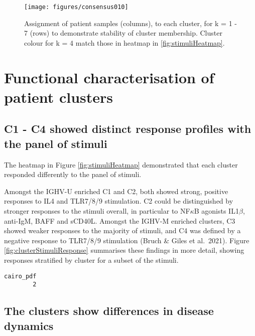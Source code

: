 \documentclass[11pt, a4paper, twosided]{book}
\begin{document}
\begin{figure}

{\centering \texttt{[image: figures/consensus010]} 

}

\caption{Assignment of patient samples (columns), to each cluster, for k = 1 - 7 (rows) to demonstrate stability of cluster membership. Cluster colour for k = 4 match those in heatmap in \ref{fig:stimuliHeatmap}.}\label{fig:consensusClusteringB}
\end{figure}
\hypertarget{functional-characterisation-of-patient-clusters}{%
\section{Functional characterisation of patient clusters}\label{functional-characterisation-of-patient-clusters}}

\hypertarget{c1---c4-showed-distinct-response-profiles-with-the-panel-of-stimuli}{%
\subsection{C1 - C4 showed distinct response profiles with the panel of stimuli}\label{c1---c4-showed-distinct-response-profiles-with-the-panel-of-stimuli}}

The heatmap in Figure \ref{fig:stimuliHeatmap} demonstrated that each cluster responded differently to the panel of stimuli.

Amongst the IGHV-U enriched C1 and C2, both showed strong, positive responses to IL4 and TLR7/8/9 stimulation. C2 could be distinguished by stronger responses to the stimuli overall, in particular to NF\(\kappa\)B agonists IL1\(\beta\), anti-IgM, BAFF and sCD40L. Amongst the IGHV-M enriched clusters, C3 showed weaker responses to the majority of stimuli, and C4 was defined by a negative response to TLR7/8/9 stimulation (Bruch \& Giles et al.~2021). Figure \ref{fig:clusterStimuliResponse} summarises these findings in more detail, showing responses stratified by cluster for a subset of the stimuli.


\begin{verbatim}
cairo_pdf 
        2 
\end{verbatim}
\hypertarget{the-clusters-show-differences-in-disease-dynamics}{%
\subsection{The clusters show differences in disease dynamics}\label{the-clusters-show-differences-in-disease-dynamics}}
\end{document}
